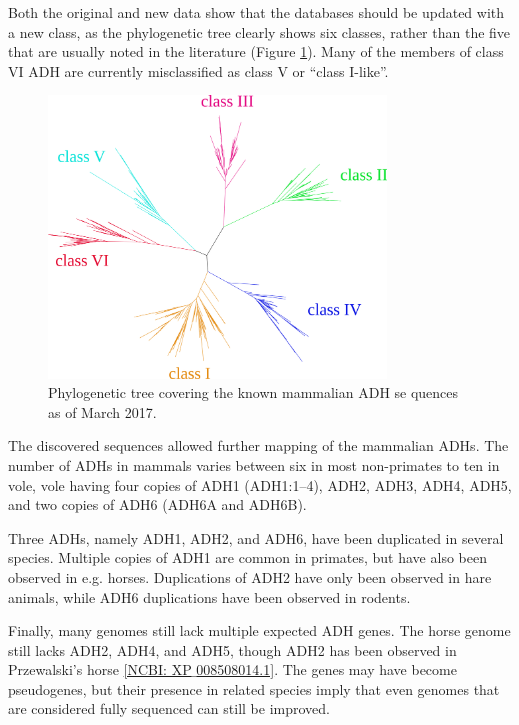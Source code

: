 \documentclass[a4paper, twoside, 12pt, openright]{report}
\begin{document}
Both the original and new data show that the databases should be updated with a new class, as the phylogenetic tree clearly shows six classes, rather than the five that are usually noted in the literature (Figure \ref{fig:adh_tree}). Many of the members of class VI ADH are currently misclassified as class V or ``class I-like''.

\begin{figure}
 \includegraphics[width=0.8\textwidth]{fig/mammalian_adh_tree.png}
 \caption{Phylogenetic tree covering the known mammalian ADH se	quences as of March 2017.}
 \label{fig:adh_tree}
\end{figure}

The discovered sequences allowed further mapping of the mammalian ADHs. The number of ADHs in mammals varies between six in most non-primates to ten in vole, vole having four copies of ADH1 (ADH1:1--4), ADH2, ADH3, ADH4, ADH5, and two copies of ADH6 (ADH6A and ADH6B).

Three ADHs, namely ADH1, ADH2, and ADH6, have been duplicated in several species. Multiple copies of ADH1 are common in primates, but have also been observed in e.g. horses. Duplications of ADH2 have only been observed in hare animals, while ADH6 duplications have been observed in rodents.

Finally, many genomes still lack multiple expected ADH genes. The horse genome still lacks ADH2, ADH4, and ADH5, though ADH2 has been observed in Przewalski's horse \href{https://www.ncbi.nlm.nih.gov/protein/664777432}{[NCBI: XP$\_$008508014.1]}. The genes may have become pseudogenes, but their presence in related species imply that even genomes that are considered fully sequenced can still be improved.
\end{document}
